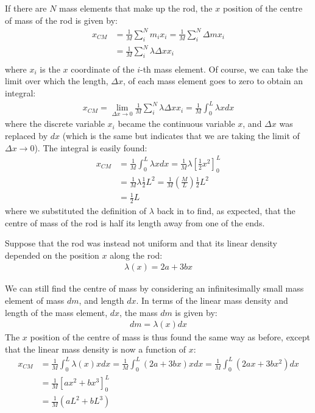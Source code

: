 If there are $N$ mass elements that make up the rod, the $x$ position of the centre of mass of the rod is given by:
\begin{align*}
x_{CM} &= \frac{1}{M}\sum_i^N m_i x_i = \frac{1}{M}\sum_i^N \Delta m x_i \\
&=\frac{1}{M}\sum_i^N \lambda \Delta x x_i\\
\end{align*}
where $x_i$ is the $x$ coordinate of the $i$-th mass element. Of course, we can take the limit over which the length, $\Delta x$, of each mass element goes to zero to obtain an integral:
\begin{align*}
x_{CM} = \lim_{\Delta x \to 0} \frac{1}{M}\sum_i^N \lambda \Delta x x_i = \frac{1}{M} \int_0^L \lambda x dx
\end{align*} 
where the discrete variable $x_i$ became the continuous variable $x$, and $\Delta x$ was replaced by $dx$ (which is the same but indicates that we are taking the limit of $\Delta x \to 0$). The integral is easily found:
\begin{align*}
x_{CM} &= \frac{1}{M} \int_0^L \lambda x dx = \frac{1}{M}\lambda \left[ \frac{1}{2} x^2\right]_0^L\\
&=\frac{1}{M}\lambda \frac{1}{2} L^2 = \frac{1}{M}\left( \frac{M}{L}\right) \frac{1}{2} L^2\\
&=\frac{1}{2}L
\end{align*}
where we substituted the definition of $\lambda$ back in to find, as expected, that the centre of mass of the rod is half its length away from one of the ends.

Suppose that the rod was instead not uniform and that its linear density depended on the position $x$ along the rod:
\begin{align*}
\lambda(x) = 2a + 3bx
\end{align*}

We can still find the centre of mass by considering an infinitesimally small mass element of mass $dm$, and length $dx$. In terms of the linear mass density and length of the mass element, $dx$, the mass $dm$ is given by:
\begin{align*}
dm = \lambda(x) dx
\end{align*}
The $x$ position of the centre of mass is thus found the same way as before, except that the linear mass density is now a function of $x$:
\begin{align*}
x_{CM} &= \frac{1}{M} \int_0^L \lambda(x) x dx =\frac{1}{M} \int_0^L (2a + 3bx) x dx=\frac{1}{M} \int_0^L (2ax + 3bx^2) dx\\
&=\frac{1}{M}  \left[  ax^2 + bx^3  \right]_0^L\\
&=\frac{1}{M} (aL^2 + bL^3 )
\end{align*}

